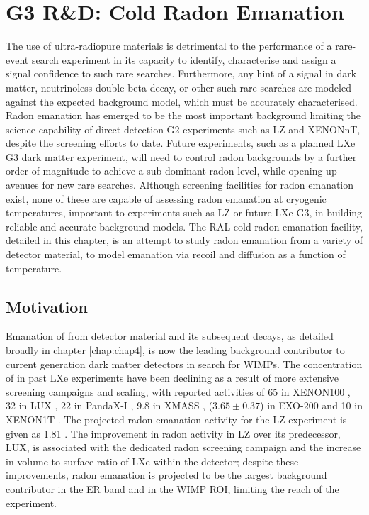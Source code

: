 \chapter{G3 R\&D: Cold Radon Emanation}
\label{chap:chap7}

The use of ultra-radiopure materials is detrimental to the performance of a rare-event search experiment in its capacity to identify, characterise and assign a signal confidence to such rare searches. Furthermore, any hint of a signal in dark matter, neutrinoless double beta decay, or other such rare-searches are modeled against the expected background model, which must be accurately characterised. Radon emanation has emerged to be the most important background limiting the science capability of direct detection G2 experiments such as LZ and XENONnT, despite the screening efforts to date. Future experiments, such as a planned LXe G3 dark matter experiment, will need to control radon backgrounds by a further order of magnitude to achieve a sub-dominant radon level, while opening up avenues for new rare searches. Although screening facilities for radon emanation exist, none of these are capable of assessing radon emanation at cryogenic temperatures, important to experiments such as LZ or future LXe G3, in building reliable and accurate background models. The RAL cold radon emanation facility, detailed in this chapter, is an attempt to study radon emanation from a variety of detector material, to model emanation via recoil and diffusion as a function of temperature.
 
 
\section{Motivation}
\label{sec:motivation_7}

Emanation of \RnTTT{} from detector material and its subsequent decays, as detailed broadly in chapter \ref{chap:chap4}, is now the leading background contributor to current generation dark matter detectors in search for WIMPs. The concentration of \RnTTT{} in past LXe experiments have been declining as a result of more extensive screening campaigns and scaling, with reported activities of 65 \uBqkg{} in XENON100 \cite{Aprile:2012nq}, 32 \uBqkg{} in LUX \cite{Akerib:2013tjd}, 22 \uBqkg{} in PandaX-I \cite{Xiao:2014xyn}, 9.8 \uBqkg{} in XMASS \cite{Abe:2013tc}, ($3.65\pm0.37$) \uBqkg{} in EXO-200 \cite{Albert:2015nta} and 10 \uBqkg{} in XENON1T \cite{xenon1t_radon}. The projected radon emanation activity for the LZ experiment is given as 1.81 \uBqkg{}. The improvement in radon activity in LZ over its predecessor, LUX, is associated with the dedicated radon screening campaign \cite{lz_screening} and the increase in volume-to-surface ratio of LXe within the detector; despite these improvements, radon emanation is projected to be the largest background contributor in the ER band and in the WIMP ROI, limiting the reach of the experiment. 

